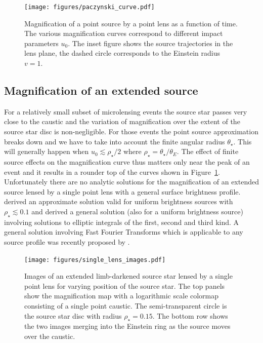 \documentclass[11pt]{report}
\begin{document}
\begin{figure}[t]
    \begin{centering}
        \texttt{[image: figures/paczynski\_curve.pdf]}
        \caption{
            Magnification of a point source by a point lens as a function of time. The
            various magnification curves correspond to different impact parameters $u_0$. The inset figure
            shows the source trajectories in the lens plane, the dashed circle corresponds
            to the Einstein radius $v=1$.}
        \label{fig:paczynski_curve}
    \end{centering}
\end{figure}

\subsection{Magnification of an extended source}
For a relatively small subset of microlensing events the source star passes
very close to the caustic and the variation of magnification over the extent of
the source star disc is non-negligible. For those events the point source
approximation breaks down and we have to take into account the finite angular
radius $\theta_\star$. This will generally happen when $u_0 \lesssim
    \rho_\star/2$ \citep{1997ApJ...477..580G} where
$\rho_\star=\theta_\star/\theta_E$. The effect of finite source effects on the
magnification curve thus matters only near the peak of an event and it results
in a rounder top of the curves shown in Figure~\ref{fig:paczynski_curve}.
Unfortunately there are no analytic solutions for the magnification of an
extended source lensed by a single point lens with a general surface brightness
profile. \citet{1994ApJ...421L..71G} derived an approximate solution valid for
uniform brightness sources with $\rho_\star\lesssim 0.1$ and
\citet{1994ApJ...430..505W} derived a general solution (also for a uniform
brightness source) involving solutions to elliptic integrals of the first,
second and third kind. A general solution involving Fast Fourier Transforms
which is applicable to any source profile was recently proposed by
\citet{2022arXiv220306637S}.

\begin{figure}[t]
    \begin{centering}
        \texttt{[image: figures/single\_lens\_images.pdf]}
        \caption{Images of an extended limb-darkened source star lensed by a single
            point lens for varying position of the source star. The top panels show the magnification map with a logarithmic scale
            colormap  consisting of a single point caustic. The semi-transparent circle
            is the source star disc with radius $\rho_\star=0.15$. The bottom row shows
            the two images merging into the Einstein ring as the source moves over the caustic.}
        \label{fig:single_lens_images}
    \end{centering}
\end{figure}
\end{document}
